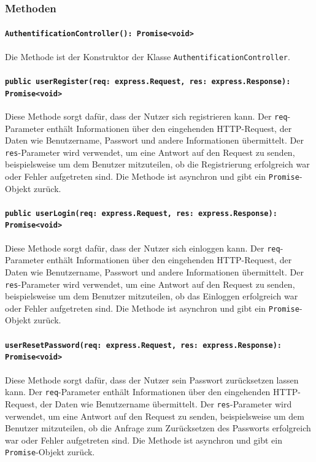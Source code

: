 \documentclass{entwurfsheft}
\begin{document}
\begin{sloppypar}
\subsubsection*{Methoden}
\paragraph{\texttt{AuthentificationController(): Promise<void>\\}}
Die Methode ist der Konstruktor der Klasse \texttt{AuthentificationController}.
\paragraph{\texttt{public userRegister(req: express.Request, res: express.Response): Promise<void>\\}}
Diese Methode sorgt dafür, dass der Nutzer sich registrieren kann. Der \texttt{req}-Parameter enthält Informationen über den eingehenden HTTP-Request, der Daten wie Benutzername, Passwort und andere Informationen übermittelt. Der \texttt{res}-Parameter wird verwendet, um eine Antwort auf den Request zu senden, beispielsweise um dem Benutzer mitzuteilen, ob die Registrierung erfolgreich war oder Fehler aufgetreten sind.
Die Methode ist asynchron und gibt ein \texttt{Promise}-Objekt zurück.
\paragraph{\texttt{public userLogin(req: express.Request, res: express.Response): Promise<void>\\}}
Diese Methode sorgt dafür, dass der Nutzer sich einloggen kann. Der \texttt{req}-Parameter enthält Informationen über den eingehenden HTTP-Request, der Daten wie Benutzername, Passwort und andere Informationen übermittelt. Der \texttt{res}-Parameter wird verwendet, um eine Antwort auf den Request zu senden, beispielsweise um dem Benutzer mitzuteilen, ob das Einloggen erfolgreich war oder Fehler aufgetreten sind.
Die Methode ist asynchron und gibt ein \texttt{Promise}-Objekt zurück. 
\paragraph{\texttt{userResetPassword(req: express.Request, res: express.Response): Promise<void>\\}}
Diese Methode sorgt dafür, dass der Nutzer sein Passwort zurücksetzen lassen kann. Der \texttt{req}-Parameter enthält Informationen über den eingehenden HTTP-Request, der Daten wie Benutzername übermittelt. Der \texttt{res}-Parameter wird verwendet, um eine Antwort auf den Request zu senden, beispielsweise um dem Benutzer mitzuteilen, ob die Anfrage zum Zurücksetzen des Passworts erfolgreich war oder Fehler aufgetreten sind. Die Methode ist asynchron und gibt ein \texttt{Promise}-Objekt zurück.

\end{sloppypar}
\end{document}
